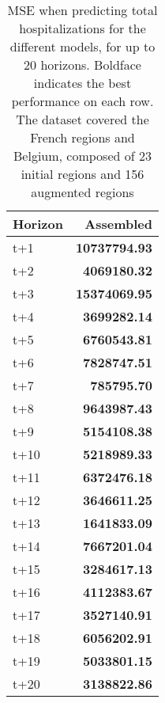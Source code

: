 \begin{table}[H]
\centering
\caption{MSE when predicting total hospitalizations for the different models, for up to 20 horizons. Boldface indicates the best performance on each row. The dataset covered the French regions and Belgium, composed of 23 initial regions and 156 augmented regions }
\label{tab:MSE_comparison}
\begin{tabular}{lr}
\toprule
Horizon &   Assembled \\
\midrule
t+1  & \textbf{10737794.93}  \\
t+2  & \textbf{4069180.32}  \\
t+3  & \textbf{15374069.95}  \\
t+4  & \textbf{3699282.14}  \\
t+5  & \textbf{6760543.81}  \\
t+6  & \textbf{7828747.51}  \\
t+7  & \textbf{785795.70}  \\
t+8  & \textbf{9643987.43}  \\
t+9  & \textbf{5154108.38}  \\
t+10  & \textbf{5218989.33}  \\
t+11  & \textbf{6372476.18}  \\
t+12  & \textbf{3646611.25}  \\
t+13  & \textbf{1641833.09}  \\
t+14  & \textbf{7667201.04}  \\
t+15  & \textbf{3284617.13}  \\
t+16  & \textbf{4112383.67}  \\
t+17  & \textbf{3527140.91}  \\
t+18  & \textbf{6056202.91}  \\
t+19  & \textbf{5033801.15}  \\
t+20  & \textbf{3138822.86}  \\

\bottomrule
\end{tabular}
\end{table}

